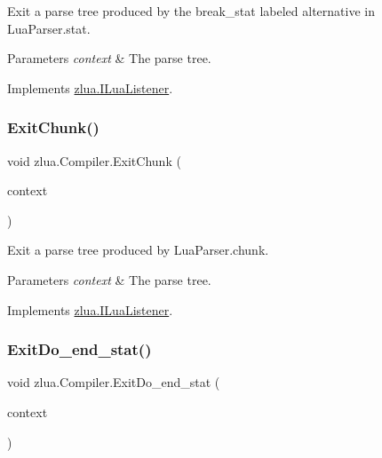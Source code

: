 Exit a parse tree produced by the {\ttfamily break\+\_\+stat} labeled alternative in Lua\+Parser.\+stat. 


\begin{DoxyParams}{Parameters}
{\em context} & The parse tree.\\
\hline
\end{DoxyParams}


Implements \mbox{\hyperlink{interfacezlua_1_1_i_lua_listener_a869e5a8abc4ddac071073a74bf09b6c5}{zlua.\+I\+Lua\+Listener}}.

\mbox{\label{classzlua_1_1_compiler_a1f313aa9552acb3fa730ac091a4fa17d}} 
\subsubsection{\texorpdfstring{Exit\+Chunk()}{ExitChunk()}}
{\footnotesize\ttfamily void zlua.\+Compiler.\+Exit\+Chunk (\begin{DoxyParamCaption}\item[{\mbox{[}\+Not\+Null\mbox{]} \mbox{\hyperlink{classzlua_1_1_lua_parser_1_1_chunk_context}{Lua\+Parser.\+Chunk\+Context}}}]{context }\end{DoxyParamCaption})}



Exit a parse tree produced by Lua\+Parser.\+chunk. 


\begin{DoxyParams}{Parameters}
{\em context} & The parse tree.\\
\hline
\end{DoxyParams}


Implements \mbox{\hyperlink{interfacezlua_1_1_i_lua_listener_ae7d177d2d81dce7f3eca3f59aeef7732}{zlua.\+I\+Lua\+Listener}}.

\mbox{\label{classzlua_1_1_compiler_aaad82853d1a4a26480b3ae56adbc58f6}} 
\subsubsection{\texorpdfstring{Exit\+Do\+\_\+end\+\_\+stat()}{ExitDo\_end\_stat()}}
{\footnotesize\ttfamily void zlua.\+Compiler.\+Exit\+Do\+\_\+end\+\_\+stat (\begin{DoxyParamCaption}\item[{\mbox{[}\+Not\+Null\mbox{]} \mbox{\hyperlink{classzlua_1_1_lua_parser_1_1_do__end__stat_context}{Lua\+Parser.\+Do\+\_\+end\+\_\+stat\+Context}}}]{context }\end{DoxyParamCaption})}



